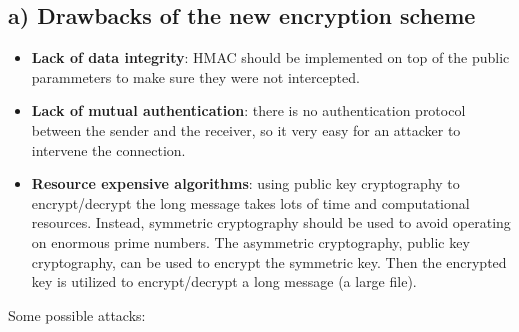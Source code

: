 \subsection*{a) Drawbacks of the new encryption scheme}
%
\begin{itemize}
    \item \textbf{Lack of data integrity}: HMAC should be implemented on top of the
    public parammeters to make sure they were not intercepted.
    \item \textbf{Lack of mutual authentication}: there is no authentication protocol between
    the sender and the receiver, so it very easy for an attacker to intervene the 
    connection.
    \item \textbf{Resource expensive algorithms}: using public key cryptography to
    encrypt/decrypt the long message takes lots of time and computational
    resources. Instead, symmetric cryptography should be used to avoid 
    operating on enormous prime numbers. The asymmetric cryptography, public key
    cryptography, can be used to encrypt the symmetric key. Then the encrypted
    key is utilized to encrypt/decrypt a long message (a large file).
\end{itemize}

Some possible attacks:

